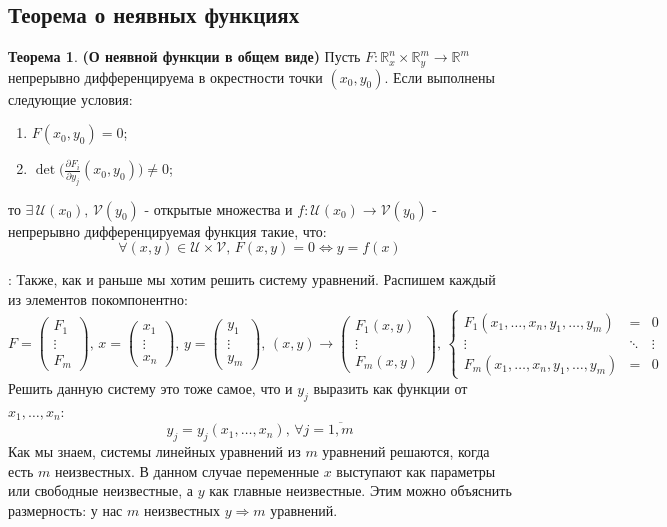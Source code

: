 \documentclass[12pt]{article}
\newcommand{\MR}{\mathbb{R}}
\newcommand{\MU}{\mathcal{U}}
\newcommand{\MV}{\mathcal{V}}
\theoremstyle{definition}
\newtheorem{theorem}{Теорема}
\begin{document}
\subsection*{Теорема о неявных функциях}
\begin{theorem}\textbf{(О неявной функции в общем виде)} 
	Пусть $F \colon \MR_x^n \times \MR_y^m \to \MR^m$ непрерывно дифференцируема в окрестности точки $(x_0, y_0)$. Если выполнены следующие условия:
	\begin{enumerate}[label ={\arabic*)}]
		\item $F(x_0,y_0) = 0$;
		\item $\det{\big(\tfrac{\partial F_i}{\partial y_j}(x_0,y_0)\big)} \neq 0$;
	\end{enumerate}
	то $\exists \, \MU(x_0),\, \MV(y_0)$ - открытые множества и $f \colon \MU(x_0) \to \MV(y_0)$ - непрерывно дифференцируемая функция такие, что: 
	$$
		\forall (x,y) \in \MU \times \MV, \, F(x,y) = 0 \Leftrightarrow y = f(x)
	$$
\end{theorem}
\textbf{}: Также, как и раньше мы хотим решить систему уравнений. Распишем каждый из элементов покомпонентно:
$$
	F = \begin{pmatrix}
		F_1 \\
		\vdots \\
		F_m
	\end{pmatrix}, \, 
	x = \begin{pmatrix}
		x_1 \\ 
		\vdots \\
		x_n
	\end{pmatrix}, \,
	y = \begin{pmatrix}
		y_1 \\
		\vdots \\
		y_m
	\end{pmatrix}, \, 
	(x,y) \to \begin{pmatrix}
		F_1(x,y) \\
		\vdots \\
		F_m(x,y)
	\end{pmatrix},\,
	\left\{
	\begin{array}{ccc}
		F_1(x_1, \dotsc, x_n, y_1, \dotsc, y_m) & = &  0 \\
		\vdots & \ddots & \vdots \\
		F_m(x_1, \dotsc, x_n, y_1, \dotsc, y_m) & = &  0 
	\end{array}
	\right.
$$
Решить данную систему это тоже самое, что и $y_j$ выразить как функции от $x_1, \dotsc, x_n$:
$$
	y_j = y_j(x_1, \dotsc, x_n), \, \forall j = \overline{1,m}
$$
Как мы знаем, системы линейных уравнений из $m$ уравнений решаются, когда есть $m$ неизвестных. В данном случае переменные $x$ выступают как параметры или свободные неизвестные, а $y$ как главные неизвестные. Этим можно объяснить размерность: у нас $m$ неизвестных $y \Rightarrow m$ уравнений.
\end{document}
